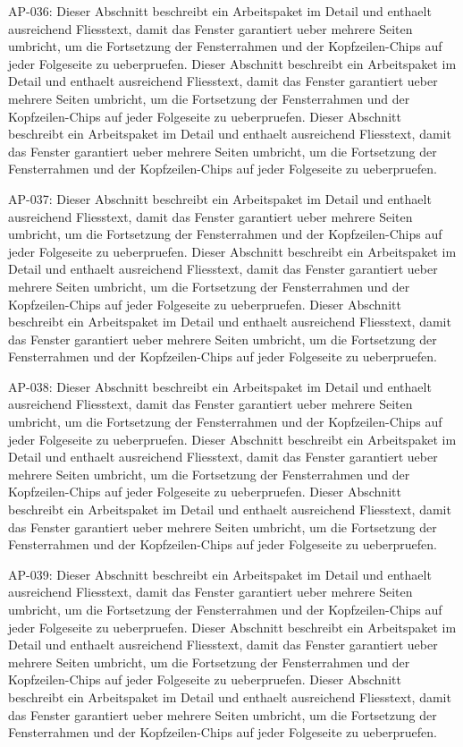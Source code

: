 \documentclass[type=report,theme=dark,language=de]{semio}
\begin{document}
\begin{Table}[title=Lange Tabelle]
AP-036: Dieser Abschnitt beschreibt ein Arbeitspaket im Detail und enthaelt ausreichend Fliesstext, damit das Fenster garantiert ueber mehrere Seiten umbricht, um die Fortsetzung der Fensterrahmen und der Kopfzeilen-Chips auf jeder Folgeseite zu ueberpruefen. Dieser Abschnitt beschreibt ein Arbeitspaket im Detail und enthaelt ausreichend Fliesstext, damit das Fenster garantiert ueber mehrere Seiten umbricht, um die Fortsetzung der Fensterrahmen und der Kopfzeilen-Chips auf jeder Folgeseite zu ueberpruefen. Dieser Abschnitt beschreibt ein Arbeitspaket im Detail und enthaelt ausreichend Fliesstext, damit das Fenster garantiert ueber mehrere Seiten umbricht, um die Fortsetzung der Fensterrahmen und der Kopfzeilen-Chips auf jeder Folgeseite zu ueberpruefen. 

AP-037: Dieser Abschnitt beschreibt ein Arbeitspaket im Detail und enthaelt ausreichend Fliesstext, damit das Fenster garantiert ueber mehrere Seiten umbricht, um die Fortsetzung der Fensterrahmen und der Kopfzeilen-Chips auf jeder Folgeseite zu ueberpruefen. Dieser Abschnitt beschreibt ein Arbeitspaket im Detail und enthaelt ausreichend Fliesstext, damit das Fenster garantiert ueber mehrere Seiten umbricht, um die Fortsetzung der Fensterrahmen und der Kopfzeilen-Chips auf jeder Folgeseite zu ueberpruefen. Dieser Abschnitt beschreibt ein Arbeitspaket im Detail und enthaelt ausreichend Fliesstext, damit das Fenster garantiert ueber mehrere Seiten umbricht, um die Fortsetzung der Fensterrahmen und der Kopfzeilen-Chips auf jeder Folgeseite zu ueberpruefen. 

AP-038: Dieser Abschnitt beschreibt ein Arbeitspaket im Detail und enthaelt ausreichend Fliesstext, damit das Fenster garantiert ueber mehrere Seiten umbricht, um die Fortsetzung der Fensterrahmen und der Kopfzeilen-Chips auf jeder Folgeseite zu ueberpruefen. Dieser Abschnitt beschreibt ein Arbeitspaket im Detail und enthaelt ausreichend Fliesstext, damit das Fenster garantiert ueber mehrere Seiten umbricht, um die Fortsetzung der Fensterrahmen und der Kopfzeilen-Chips auf jeder Folgeseite zu ueberpruefen. Dieser Abschnitt beschreibt ein Arbeitspaket im Detail und enthaelt ausreichend Fliesstext, damit das Fenster garantiert ueber mehrere Seiten umbricht, um die Fortsetzung der Fensterrahmen und der Kopfzeilen-Chips auf jeder Folgeseite zu ueberpruefen. 

AP-039: Dieser Abschnitt beschreibt ein Arbeitspaket im Detail und enthaelt ausreichend Fliesstext, damit das Fenster garantiert ueber mehrere Seiten umbricht, um die Fortsetzung der Fensterrahmen und der Kopfzeilen-Chips auf jeder Folgeseite zu ueberpruefen. Dieser Abschnitt beschreibt ein Arbeitspaket im Detail und enthaelt ausreichend Fliesstext, damit das Fenster garantiert ueber mehrere Seiten umbricht, um die Fortsetzung der Fensterrahmen und der Kopfzeilen-Chips auf jeder Folgeseite zu ueberpruefen. Dieser Abschnitt beschreibt ein Arbeitspaket im Detail und enthaelt ausreichend Fliesstext, damit das Fenster garantiert ueber mehrere Seiten umbricht, um die Fortsetzung der Fensterrahmen und der Kopfzeilen-Chips auf jeder Folgeseite zu ueberpruefen. 


\end{Table}
\end{document}
